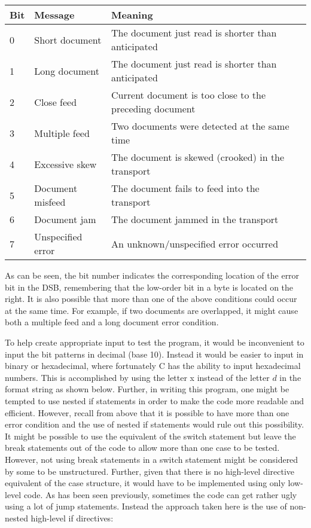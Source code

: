 \documentclass[10pt]{article}
\begin{document}
\begin{center}
\begin{tabular}{|lll|}
\hline
Bit & Message & Meaning \\
\hline
0 & Short document & The document just read is shorter than anticipated \\
1 & Long document & The document just read is shorter than anticipated \\
2 & Close feed & Current document is too close to the preceding document \\
3 & Multiple feed & Two documents were detected at the same time \\
4 & Excessive skew & The document is skewed (crooked) in the transport \\
5 & Document misfeed & The document fails to feed into the transport \\
6 & Document jam & The document jammed in the transport \\
7 & Unspecified error & An unknown/unspecified error occurred \\
\hline
\end{tabular}
\end{center}

As can be seen, the bit number indicates the corresponding location of the error bit in the DSB, remembering that the low-order bit in a byte is located on the right. It is also possible that more than one of the above conditions could occur at the same time. For example, if two documents are overlapped, it might cause both a multiple feed and a long document error condition.

To help create appropriate input to test the program, it would be inconvenient to input the bit patterns in decimal (base 10). Instead it would be easier to input in binary or hexadecimal, where fortunately C has the ability to input hexadecimal numbers. This is accomplished by using the letter x instead of the letter $d$ in the format string as shown below. Further, in writing this program, one might be tempted to use nested if statements in order to make the code more readable and efficient. However, recall from above that it is possible to have more than one error condition and the use of nested if statements would rule out this possibility. It might be possible to use the equivalent of the switch statement but leave the break statements out of the code to allow more than one case to be tested. However, not using break statements in a switch statement might be considered by some to be unstructured. Further, given that there is no high-level directive equivalent of the case structure, it would have to be implemented using only low-level code. As has been seen previously, sometimes the code can get rather ugly using a lot of jump statements. Instead the approach taken here is the use of non-nested high-level if directives:
\end{document}

